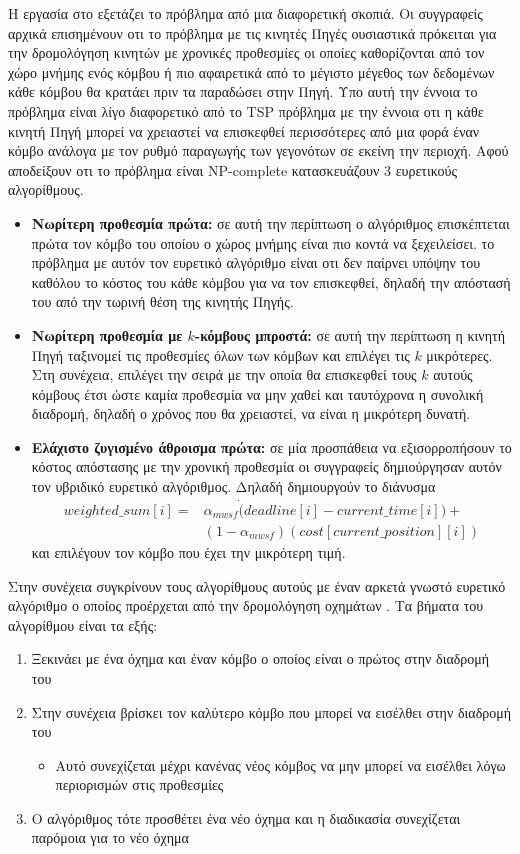 Η εργασία στο \cite{dynamic_deadlines} εξετάζει το πρόβλημα από μια διαφορετική σκοπιά. Οι συγγραφείς αρχικά επισημένουν οτι το πρόβλημα με τις κινητές Πηγές
ουσιαστικά πρόκειται για την δρομολόγηση κινητών με χρονικές προθεσμίες οι οποίες καθορίζονται από τον χώρο μνήμης ενός κόμβου ή πιο αφαιρετικά από το μέγιστο μέγεθος
των δεδομένων κάθε κόμβου θα κρατάει πριν τα παραδώσει στην Πηγή. Υπο αυτή την έννοια το πρόβλημα είναι λίγο διαφορετικό από το TSP πρόβλημα με την έννοια οτι η κάθε
κινητή Πηγή μπορεί να χρειαστεί να επισκεφθεί περισσότερες από μια φορά έναν κόμβο ανάλογα με τον ρυθμό παραγωγής των γεγονότων σε εκείνη την περιοχή. Αφού
αποδείξουν οτι το πρόβλημα είναι NP-complete κατασκευάζουν 3 ευρετικούς αλγορίθμους.
\begin{itemize}
\item \textbf{Νωρίτερη προθεσμία πρώτα:} σε αυτή την περίπτωση ο αλγόριθμος επισκέπτεται πρώτα τον κόμβο του οποίου ο χώρος μνήμης είναι πιο κοντά να ξεχειλείσει. το
πρόβλημα με αυτόν τον ευρετικό αλγόριθμο είναι οτι δεν παίρνει υπόψην του καθόλου το κόστος του κάθε κόμβου για να τον επισκεφθεί, δηλαδή την απόστασή του από την
τωρινή θέση της κινητής Πηγής.
\item \textbf{Νωρίτερη προθεσμία με $k$-κόμβους μπροστά:} σε αυτή την περίπτωση η κινητή Πηγή ταξινομεί τις προθεσμίες όλων των κόμβων και επιλέγει τις $k$
μικρότερες. Στη συνέχεια, επιλέγει την σειρά με την οποία θα επισκεφθεί τους $k$ αυτούς κόμβους έτσι ώστε καμία προθεσμία να μην χαθεί και ταυτόχρονα η συνολική
διαδρομή, δηλαδή ο χρόνος που θα χρειαστεί, να είναι η μικρότερη δυνατή.
\item \textbf{Ελάχιστο ζυγισμένο άθροισμα πρώτα:} σε μία προσπάθεια να εξισορροπήσουν το κόστος απόστασης με την χρονική προθεσμία οι συγγραφείς δημιούργησαν αυτόν
τον υβριδικό ευρετικό αλγόριθμος. Δηλαδή δημιουργούν το διάνυσμα
\begin{align*}
weighted\_sum[i] = & \alpha_{mwsf}\dot (deadline[i]-current\_time[i]) +\\
& (1-\alpha_{mwsf})(cost[current\_position][i])
\end{align*} και επιλέγουν τον κόμβο που έχει την μικρότερη τιμή.
\end{itemize}
Στην συνέχεια συγκρίνουν τους αλγορίθμους αυτούς με έναν αρκετά γνωστό
ευρετικό αλγόριθμο ο οποίος προέρχεται από την δρομολόγηση οχημάτων \cite{vehicle_routing_windows}. Τα βήματα του αλγορίθμου είναι τα εξής:
\begin{enumerate}
\item Ξεκινάει με ένα όχημα και έναν κόμβο ο οποίος είναι ο πρώτος στην διαδρομή του
\item Στην συνέχεια βρίσκει τον καλύτερο κόμβο που μπορεί να εισέλθει στην διαδρομή του
\begin{itemize}
	\item Αυτό συνεχίζεται μέχρι κανένας νέος κόμβος να μην μπορεί να εισέλθει λόγω περιορισμών στις προθεσμίες
\end{itemize}
\item Ο αλγόριθμος τότε προσθέτει ένα νέο όχημα και η διαδικασία συνεχίζεται παρόμοια για το νέο όχημα
\end{enumerate}
